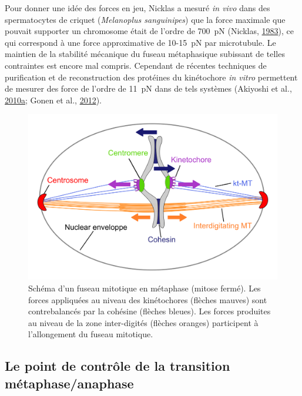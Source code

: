 \documentclass[12pt,a4paper,twoside,openright]{book}
\begin{document}
Pour donner une idée des forces en jeu, Nicklas a mesuré \emph{in vivo}
dans des spermatocytes de criquet (\emph{Melanoplus sanguinipes}) que la
force maximale que pouvait supporter un chromosome était de l'ordre de
700~pN (Nicklas, \protect\hyperlink{ref-Nicklas1983}{1983}), ce qui
correspond à une force approximative de 10-15~pN par microtubule. Le
maintien de la stabilité mécanique du fuseau métaphasique subissant de
telles contraintes est encore mal compris. Cependant de récentes
techniques de purification et de reconstruction des protéines du
kinétochore \emph{in vitro} permettent de mesurer des force de l'ordre
de 11~pN dans de tels systèmes (Akiyoshi et al.,
\protect\hyperlink{ref-Akiyoshi2010a}{2010}\protect\hyperlink{ref-Akiyoshi2010a}{a};
Gonen et al., \protect\hyperlink{ref-Gonen2012a}{2012}).

\begin{figure}[htbp]
\centering
\includegraphics{figures/intro/spindle.png}
\caption[Schéma d'un fuseau mitotique en métaphase]{\label{fig:spindle}Schéma
d'un fuseau mitotique en métaphase (mitose fermé). Les forces appliquées
au niveau des kinétochores (flèches mauves) sont contrebalancés par la
cohésine (flèches bleues). Les forces produites au niveau de la zone
inter-digités (flèches oranges) participent à l'allongement du fuseau
mitotique.}
\end{figure}

\subsection{Le point de contrôle de la transition
métaphase/anaphase}\label{le-point-de-contruxf4le-de-la-transition-muxe9taphaseanaphase}
\end{document}

